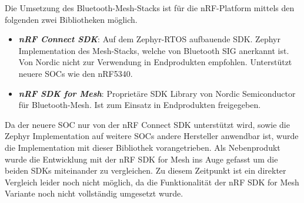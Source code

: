 Die Umsetzung des Bluetooth-Mesh-Stacks ist für die nRF-Platform mittels den folgenden zwei Bibliotheken möglich. 

\begin{itemize}
	\item \textit{\textbf{nRF Connect SDK}}: Auf dem Zephyr-RTOS aufbauende SDK. Zephyr Implementation des Mesh-Stacks, welche von Bluetooth SIG anerkannt ist. Von Nordic nicht zur Verwendung in Endprodukten empfohlen. Unterstützt neuere SOCs wie den nRF5340.  \cite{nordic_semi_welcome_to_the_nrf_connect_sdk_2020}
	\item \textit{\textbf{nRF SDK for Mesh}}: Proprietäre SDK Library von Nordic Semiconductor für Bluetooth-Mesh. Ist zum Einsatz in Endprodukten freigegeben. \cite{nordic_semi_nrf_sdk_for_mesh_2020}
\end{itemize}

Da der neuere SOC nur von der nRF Connect SDK unterstützt wird, sowie die Zephyr Implementation auf weitere SOCs andere Hersteller anwendbar ist, wurde die Implementation mit dieser Bibliothek vorangetrieben. Als Nebenprodukt wurde die Entwicklung mit der nRF SDK for Mesh ins Auge gefasst um die beiden SDKs miteinander zu vergleichen. Zu diesem Zeitpunkt ist ein direkter Vergleich leider noch nicht möglich, da die Funktionalität der nRF SDK for Mesh Variante noch nicht vollständig umgesetzt wurde. 





